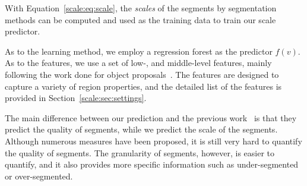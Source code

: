 With Equation~\ref{scale:eq:scale}, the \emph{scales} of the segments by
segmentation methods can be computed and used as the training data to
train our scale predictor.

As to the learning method, we employ a regression forest as the predictor $f(v)$.
As to the features, we use a set of low-, and middle-level features, mainly following the work
done for object proposals~\citep{carreira2010constrained,arbelaez2014multiscale}.
The features are designed to capture a variety of region properties, and the detailed list of the features is provided in Section~\ref{scale:sec:settings}.

The main difference between our prediction and the previous
work~\citep{carreira2010constrained, ren2003learning, arbelaez2014multiscale} is that they predict the quality of segments, while we
predict the scale of the segments. Although numerous measures have
been proposed, it is still very hard to quantify the quality of
segments.
The granularity of segments, however, is easier to quantify,
and it also provides more specific information such as under-segmented
or over-segmented.



